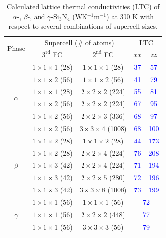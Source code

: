 \documentclass[twocolumn,amsmath,amssymb,a4paper,prb,superscriptaddress,floatfix]{revtex4-1}
\begin{document}
\begin{table}[ht]
	\caption{\label{table:LTC} Calculated lattice thermal conductivities 
 (LTC) of $\alpha$-, $\beta$-, and $\gamma$-Si$_3$N$_4$
 (WK$^{-1}$m$^{-1}$) at 300 K with respect to several combinations of
 supercell sizes.}
 \begin{ruledtabular}
  \begin{tabular}{ccccc}
   \multirow{2}{*}{Phase}
   & \multicolumn{2}{c}{Supercell (\# of atoms)} &
   \multicolumn{2}{c}{LTC} \\
   \cline{2-5}
   & $3^\text{rd}$ FC & $2^\text{nd}$ FC & $xx$ & $zz$ \\
   \hline
   \multirow{6}{*}{$\alpha$}
   & $1\times 1\times 1$ (28) & $1\times
   1\times 1$ (28) & \textcolor{blue}{37} &   \textcolor{blue}{57} \\ 
   & $1\times 1\times 2$ (56) & $1\times
   1\times 2$ (56) & \textcolor{blue}{41} &   \textcolor{blue}{79} \\ 
   & $1\times 1\times 1$ (28) & $2\times
   2\times 2$ (224) & \textcolor{blue}{55} &   \textcolor{blue}{81} \\ 
   & $1\times 1\times 2$ (56) & $2\times
   2\times 2$ (224) & \textcolor{blue}{67} &   \textcolor{blue}{95} \\ 
   & $1\times 1\times 2$ (56) & $2\times
   2\times 3$ (336) & \textcolor{blue}{68} &  \textcolor{blue}{97} \\ 
   & $1\times 1\times 2$ (56) & $3\times
   3\times 4$ (1008) & \textcolor{blue}{68} &  \textcolor{blue}{100} \\ 
   \hline
   \multirow{5}{*}{$\beta$}
   & $1\times 1\times 2$ (28) & $1\times
   1\times 2$ (28) & \textcolor{blue}{44} & \textcolor{blue}{173} \\ 
   & $1\times 1\times 2$ (28) & $2\times
   2\times 4$ (224) & \textcolor{blue}{76} &  \textcolor{blue}{208} \\ 
   & $1\times 1\times 3$ (42) & $2\times
   2\times 4$ (224) & \textcolor{blue}{71} & \textcolor{blue}{194} \\ 
   & $1\times 1\times 3$ (42) & $2\times
   2\times 5$ (280) & \textcolor{blue}{72} & \textcolor{blue}{196} \\ 
   & $1\times 1\times 3$ (42) & $3\times
   3\times 8$ (1008) & \textcolor{blue}{73} & \textcolor{blue}{199} \\ 
   \hline
   \multirow{3}{*}{$\gamma$}
   & $1\times 1\times 1$ (56) & $1\times
   1\times 1$ (56) & \multicolumn{2}{c}{\textcolor{blue}{72}} \\ 
   & $1\times 1\times 1$ (56) & $2\times
   2\times 2$ (448) & \multicolumn{2}{c}{\textcolor{blue}{77}} \\ 
   & $1\times 1\times 1$ (56) & $3\times
   3\times 3$ (56) & \multicolumn{2}{c}{\textcolor{blue}{79}} \\ 
  \end{tabular}
 \end{ruledtabular}
\end{table}
\end{document}
